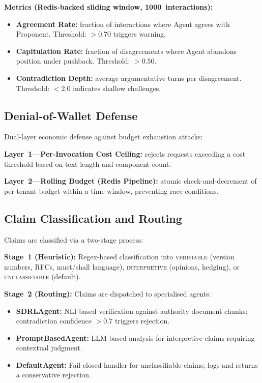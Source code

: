 \documentclass[11pt,a4paper]{article}
\begin{document}
\textbf{Metrics (Redis-backed sliding window, 1000~interactions):}
\begin{itemize}[leftmargin=*]
  \item \textbf{Agreement Rate:} fraction of interactions where Agent
        agrees with Proponent.  Threshold: $> 0.70$ triggers warning.
  \item \textbf{Capitulation Rate:} fraction of disagreements where
        Agent abandons position under pushback.  Threshold: $> 0.50$.
  \item \textbf{Contradiction Depth:} average argumentative turns per
        disagreement.  Threshold: $< 2.0$ indicates shallow challenges.
\end{itemize}

\subsection{Denial-of-Wallet Defense}

Dual-layer economic defense against budget exhaustion attacks:

\textbf{Layer~1---Per-Invocation Cost Ceiling:} rejects requests
exceeding a cost threshold based on text length and component count.

\textbf{Layer~2---Rolling Budget (Redis Pipeline):} atomic
check-and-decrement of per-tenant budget within a time window,
preventing race conditions.

\subsection{Claim Classification and Routing}

Claims are classified via a two-stage process:

\textbf{Stage~1 (Heuristic):} Regex-based classification into
\textsc{verifiable} (version numbers, RFCs, must/shall language),
\textsc{interpretive} (opinions, hedging), or
\textsc{unclassifiable} (default).

\textbf{Stage~2 (Routing):} Claims are dispatched to specialised
agents:
\begin{itemize}[leftmargin=*]
  \item \textbf{SDRLAgent:} NLI-based verification against authority
        document chunks; contradiction confidence $> 0.7$ triggers
        rejection.
  \item \textbf{PromptBasedAgent:} LLM-based analysis for
        interpretive claims requiring contextual judgment.
  \item \textbf{DefaultAgent:} Fail-closed handler for
        unclassifiable claims; logs and returns a conservative
        rejection.
\end{itemize}
\end{document}
